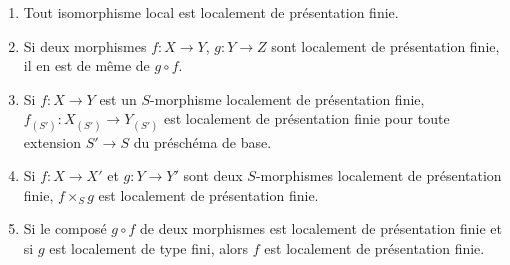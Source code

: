 \begin{proposition}[1.4.3]
\label{IV.1.4.3-fr}
\begin{enumerate}
  \item[(i)] Tout isomorphisme local est localement de présentation finie.
  \item[(ii)] Si deux morphismes $f:X\to Y$, $g:Y\to Z$ sont localement de
  présentation finie, il en est de même de $g\circ f$.


  \item[(iii)] Si $f:X\to Y$ est un $S$-morphisme localement de présentation
  finie, $f_{(S')}:X_{(S')}\to Y_{(S')}$ est localement de présentation finie
  pour toute extension $S'\to S$ du préschéma de base.
  \item[(iv)] Si $f:X\to X'$ et $g:Y\to Y'$ sont deux $S$-morphismes
  localement de présentation finie, $f\times_Sg$ est localement de
  présentation finie.
  \item[(v)] Si le composé $g\circ f$ de deux morphismes est localement de
  présentation finie et si $g$ est localement de type fini, alors $f$ est
  localement de présentation finie.
\end{enumerate}
\end{proposition}

